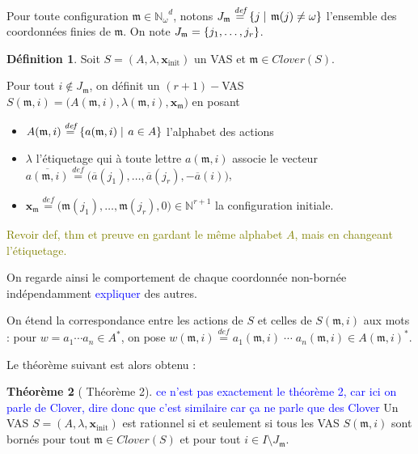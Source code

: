 \documentclass[a4paper,final]{article}
\theoremstyle{definition}
\newtheorem{Theorem}{Théorème}
\newtheorem{Definition}[Theorem]{Définition}
\newcommand{\alain}[1]{\textcolor{blue}{#1}}
\newcommand{\lucas}[1]{\textcolor{olive}{#1}}
\newcommand{\set}[2]{\left\{#1\mathrel{\left|\vphantom{#1}\vphantom{#2}\right.}#2\right\}}
\newcommand{\os}[1]{\left\{\mathinner{#1}\right\}}
\newcommand{\defeq}{\ensuremath{\stackrel{\textit{def}}{=}}}
\newcommand{\N}{\ensuremath{\mathbb{N}}}
\newcommand{\Nomega}{\ensuremath{\mathbb{N}_\omega}}
\newcommand{\clover}{\textit{Clover}}
\newcommand{\vect}[1]{\ensuremath{\mathbf{#1}}}
\newcommand{\xinit}{\ensuremath{\vect{x}_\text{init}}}
\newcommand{\valeur}[1]{\ensuremath{\overline{#1}}}
\begin{document}
Pour toute configuration  $\mathfrak{m}\in\Nomega^d$, notons $J_\mathfrak{m} \defeq \set{j}{\mathfrak{m}(j)\neq \omega}$ l'ensemble des coordonnées finies de $\mathfrak{m}$. On note $J_\mathfrak{m}=\os{j_1,\dots,j_r}$.

\begin{Definition}
Soit $S=(A,\lambda,\xinit)$ un VAS et $\mathfrak{m}\in\clover(S)$.

Pour tout $i\notin J_\mathfrak{m}$, on définit un $(r+1)-$VAS $S(\mathfrak{m},i) = \big( A(\mathfrak{m},i), \lambda(\mathfrak{m},i), \vect{x}_\mathfrak{m} \big)$ en posant
\begin{itemize}
    \item $A(\mathfrak{m},i) \defeq \set{a(\mathfrak{m},i)} {a\in A}$ 
    l'alphabet des actions
    \item $\lambda$ l'étiquetage qui à toute lettre $a(\mathfrak{m},i)$ associe le vecteur $\valeur{a(\mathfrak{m},i)} \defeq \big(\valeur{a}(j_1), \dots, \valeur{a}(j_r), -\valeur{a}(i) \big)$,
    \item $\vect{x}_\mathfrak{m} \defeq \big(\mathfrak{m}(j_1), \dots, \mathfrak{m}(j_r), 0\big) \in \N^{r+1}$ la configuration initiale.
\end{itemize}
\end{Definition}

\lucas{Revoir def, thm et preuve en gardant le même alphabet $A$, mais en changeant l'étiquetage.}

\noindent On regarde ainsi le comportement de chaque coordonnée non-bornée indépendamment \alain{expliquer} des autres.

On étend la correspondance entre les actions de $S$ et celles de $S(\mathfrak{m},i)$ aux mots : 
pour $w = a_1\cdots a_n \in A^\ast$, on pose $w(\mathfrak{m},i) \defeq a_1(\mathfrak{m},i) \;\cdots\; a_n(\mathfrak{m},i) \in A(\mathfrak{m},i)^\ast$.

Le théorème suivant est alors obtenu :

\begin{Theorem}[\cite{giyo80} Théorème 2]\alain{ce n'est pas exactement le théorème 2, car ici on parle de Clover, dire donc que c'est similaire car ça ne parle que des Clover}
    Un VAS   $S=(A,\lambda,\xinit)$ est rationnel si et seulement si 
    tous les VAS $S(\mathfrak{m},i)$ sont bornés pour tout  $\mathfrak{m} \in \clover(S)$ et pour tout $i \in I \setminus J_\mathfrak{m}$.
\end{Theorem}
\end{document}
